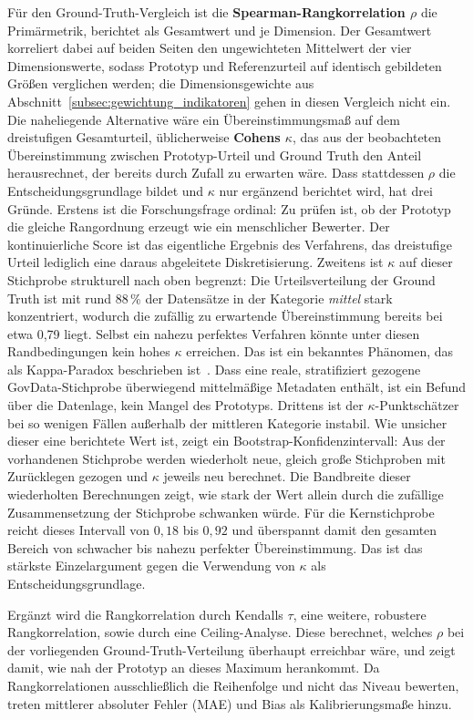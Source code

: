 Für den Ground-Truth-Vergleich ist die \textbf{Spearman-Rangkorrelation $\rho$} die
Primärmetrik, berichtet als Gesamtwert und je Dimension. Der Gesamtwert korreliert dabei
auf beiden Seiten den ungewichteten Mittelwert der vier Dimensionswerte, sodass Prototyp
und Referenzurteil auf identisch gebildeten Größen verglichen werden; die
Dimensionsgewichte aus Abschnitt~\ref{subsec:gewichtung_indikatoren} gehen in diesen
Vergleich nicht ein. Die naheliegende Alternative
wäre ein Übereinstimmungsmaß auf dem dreistufigen Gesamturteil, üblicherweise
\textbf{Cohens $\kappa$}, das aus der beobachteten Übereinstimmung zwischen
Prototyp-Urteil und Ground Truth den Anteil herausrechnet, der bereits durch Zufall zu
erwarten wäre. Dass stattdessen $\rho$ die Entscheidungsgrundlage bildet und $\kappa$
nur ergänzend berichtet wird, hat drei
Gründe. Erstens ist die Forschungsfrage ordinal: Zu prüfen ist, ob der Prototyp die gleiche
Rangordnung erzeugt wie ein menschlicher Bewerter. Der kontinuierliche Score ist das
eigentliche Ergebnis des Verfahrens, das dreistufige Urteil lediglich eine daraus
abgeleitete Diskretisierung. Zweitens ist $\kappa$ auf dieser Stichprobe strukturell nach
oben begrenzt: Die Urteilsverteilung der Ground Truth ist mit rund
88\,\% der Datensätze in der Kategorie \emph{mittel} stark konzentriert, wodurch die
zufällig zu erwartende Übereinstimmung bereits bei etwa 0,79 liegt. Selbst ein nahezu
perfektes Verfahren könnte unter diesen Randbedingungen kein hohes $\kappa$ erreichen. Das ist
ein bekanntes Phänomen, das als Kappa-Paradox beschrieben
ist~\cite{feinstein1990kappa}. Dass eine reale, stratifiziert gezogene
GovData-Stichprobe überwiegend mittelmäßige Metadaten enthält, ist ein Befund über die
Datenlage, kein Mangel des Prototyps. Drittens ist der $\kappa$-Punktschätzer bei so
wenigen Fällen außerhalb der mittleren Kategorie instabil. Wie unsicher dieser eine
berichtete Wert ist, zeigt ein Bootstrap-Konfidenzintervall: Aus der vorhandenen
Stichprobe werden wiederholt neue, gleich große Stichproben mit Zurücklegen gezogen und
$\kappa$ jeweils neu berechnet. Die Bandbreite dieser wiederholten Berechnungen zeigt,
wie stark der Wert allein durch die zufällige Zusammensetzung der Stichprobe schwanken
würde. Für die Kernstichprobe reicht dieses Intervall von $0{,}18$ bis $0{,}92$ und
überspannt damit den gesamten Bereich von schwacher bis nahezu perfekter
Übereinstimmung. Das ist das stärkste Einzelargument gegen die Verwendung von $\kappa$
als Entscheidungsgrundlage.

Ergänzt wird die Rangkorrelation durch Kendalls $\tau$, eine weitere, robustere
Rangkorrelation, sowie durch eine Ceiling-Analyse.
Diese berechnet, welches $\rho$ bei der vorliegenden Ground-Truth-Verteilung überhaupt
erreichbar wäre, und zeigt damit, wie nah der Prototyp an dieses Maximum herankommt. Da
Rangkorrelationen ausschließlich die Reihenfolge und nicht das Niveau bewerten, treten
mittlerer absoluter Fehler (\acrshort{MAE}) und Bias als Kalibrierungsmaße hinzu.

